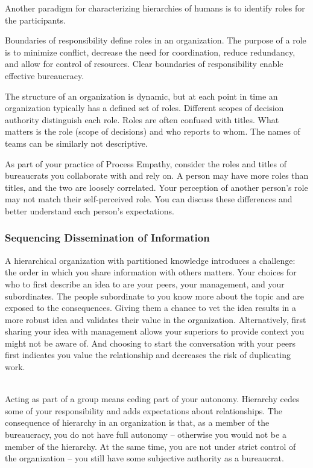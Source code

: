 Another paradigm for characterizing hierarchies of humans is to identify roles for the participants. 

Boundaries of responsibility define roles in an organization. The purpose of a role is to minimize conflict, decrease the need for coordination, reduce redundancy, and allow for control of resources. Clear boundaries of responsibility  enable effective bureaucracy. 

The structure of an organization is dynamic, but at each point in time an organization typically has a defined set of roles. Different scopes of decision authority distinguish each role. 
Roles are often confused with titles. What matters is the role (scope of decisions) and who reports to whom. The names of teams can be similarly not descriptive.

As part of your practice of Process Empathy, consider the roles and titles of bureaucrats you collaborate with and rely on. A person may have more roles than titles, and the two are loosely correlated. Your perception of another person's role may not match their self-perceived role. You can discuss these differences and better understand each person's expectations. 


\subsubsection*{Sequencing Dissemination of Information}

A hierarchical organization with partitioned knowledge introduces a challenge: the order in which you share information with others matters. Your choices for who to first describe an idea to are your peers, your management, and your subordinates. 
The people subordinate to you know more about the topic and are exposed to the consequences. Giving them a chance to vet the idea results in a more robust idea and validates their value in the organization. Alternatively, first sharing your idea with management  allows your superiors to provide context you might not be aware of. And choosing to  start the conversation with your peers first indicates you value the relationship and decreases the risk of duplicating work.


\ \\

Acting as part of a group means ceding part of your autonomy. Hierarchy cedes some of your responsibility and adds expectations about relationships.
The consequence of hierarchy in an organization is that, as a member of the bureaucracy, you do not have full autonomy -- otherwise you would not be a member of the hierarchy. At the same time, you are not under strict control of the organization -- you still have some subjective %
authority as a bureaucrat.

